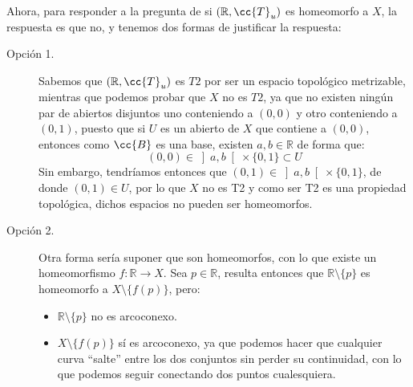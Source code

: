 \begin{ejercicio}
    \noindent
    Ahora, para responder a la pregunta de si $(\mathbb{R},\cc{T}_u)$ es homeomorfo a $X$, la respuesta es que no, y tenemos dos formas de justificar la respuesta:
    \begin{description}
        \item [Opción 1.] Sabemos que $(\mathbb{R},\cc{T}_u)$ es $T2$ por ser un espacio topológico metrizable, mientras que podemos probar que $X$ no es $T2$, ya que no existen ningún par de abiertos disjuntos uno conteniendo a $(0,0)$ y otro conteniendo a $(0,1)$, puesto que si $U$ es un abierto de $X$ que contiene a $(0,0)$, entonces como $\cc{B}$ es una base, existen $a,b\in \mathbb{R}$ de forma que:
            \begin{equation*}
                (0,0) \in \left]a,b\right[\times \{0,1\} \subset U
            \end{equation*}
            Sin embargo, tendríamos entonces que $(0,1)\in \left]a,b\right[\times \{0,1\}$, de donde $(0,1)\in U$, por lo que $X$ no es T2 y como ser T2 es una propiedad topológica, dichos espacios no pueden ser homeomorfos.
        \item [Opción 2.] Otra forma sería suponer que son homeomorfos, con lo que existe un homeomorfismo $f:\mathbb{R}\to X$. Sea $p\in \mathbb{R}$, resulta entonces que $\mathbb{R}\setminus \{p\}$ es homeomorfo a $X\setminus \{f(p)\}$, pero:
            \begin{itemize}
                \item $\mathbb{R}\setminus\{p\}$ no es arcoconexo.
                \item $X\setminus \{f(p)\}$ sí es arcoconexo, ya que podemos hacer que cualquier curva ``salte'' entre los dos conjuntos sin perder su continuidad, con lo que podemos seguir conectando dos puntos cualesquiera.
            \end{itemize}
    \end{description}
\end{ejercicio}

